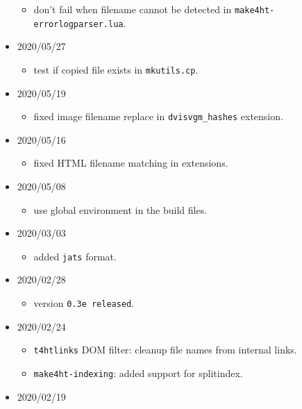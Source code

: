 \begin{itemize}
  \begin{itemize}
  \tightlist
  \item
    don't fail when filename cannot be detected in
    \texttt{make4ht-errorlogparser.lua}.
  \end{itemize}
\item
  2020/05/27

  \begin{itemize}
  \tightlist
  \item
    test if copied file exists in \texttt{mkutils.cp}.
  \end{itemize}
\item
  2020/05/19

  \begin{itemize}
  \tightlist
  \item
    fixed image filename replace in \texttt{dvisvgm\_hashes} extension.
  \end{itemize}
\item
  2020/05/16

  \begin{itemize}
  \tightlist
  \item
    fixed HTML filename matching in extensions.
  \end{itemize}
\item
  2020/05/08

  \begin{itemize}
  \tightlist
  \item
    use global environment in the build files.
  \end{itemize}
\item
  2020/03/03

  \begin{itemize}
  \tightlist
  \item
    added \texttt{jats} format.
  \end{itemize}
\item
  2020/02/28

  \begin{itemize}
  \tightlist
  \item
    version \texttt{0.3e\ released}.
  \end{itemize}
\item
  2020/02/24

  \begin{itemize}
  \tightlist
  \item
    \texttt{t4htlinks} DOM filter: cleanup file names from internal
    links.
  \item
    \texttt{make4ht-indexing}: added support for splitindex.
  \end{itemize}
\item
  2020/02/19


\end{itemize}
